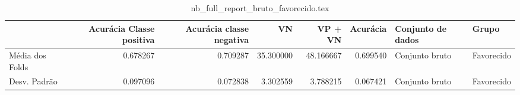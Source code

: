 \begin{table}
\centering
\caption{nb_full_report_bruto_favorecido.tex}
\label{nb_full_report_bruto_favorecido.tex}
\begin{tabular}{lrrrrrll}
\toprule
{} &  Acurácia Classe positiva &  Acurácia classe negativa &        VN  &   VP + VN  &  Acurácia & Conjunto de dados &       Grupo \\
\midrule
Média dos Folds &                  0.678267 &                  0.709287 &  35.300000 &  48.166667 &  0.699540 &    Conjunto bruto &  Favorecido \\
Desv. Padrão    &                  0.097096 &                  0.072838 &   3.302559 &   3.788215 &  0.067421 &    Conjunto bruto &  Favorecido \\
\bottomrule
\end{tabular}
\end{table}
